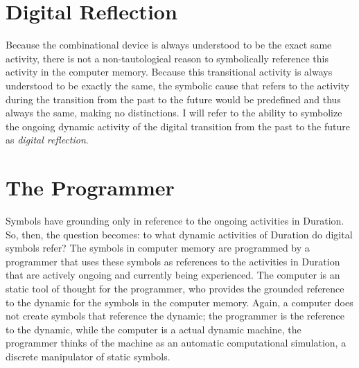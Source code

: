 \section{Digital Reflection}
\label{section:digital_reflection}

Because the combinational device is always understood to be the exact
same activity, there is not a non-tautological reason to symbolically
reference this activity in the computer memory.  Because this
transitional activity is always understood to be exactly the same, the
symbolic cause that refers to the activity during the transition from
the past to the future would be predefined and thus always the same,
making no distinctions.  I will refer to the ability to symbolize the
ongoing dynamic activity of the digital transition from the past to
the future as \emph{digital reflection}.

\section{The Programmer}

Symbols have grounding only in reference to the ongoing activities in
Duration.  So, then, the question becomes: to what dynamic activities
of Duration do digital symbols refer?  The symbols in computer memory
are programmed by a programmer that uses these symbols as references
to the activities in Duration that are actively ongoing and currently
being experienced.  The computer is an static tool of thought for the
programmer, who provides the grounded reference to the dynamic for the
symbols in the computer memory.  Again, a computer does not create
symbols that reference the dynamic; the programmer is the reference to
the dynamic, while the computer is a actual dynamic machine, the
programmer thinks of the machine as an automatic computational
simulation, a discrete manipulator of static symbols.

